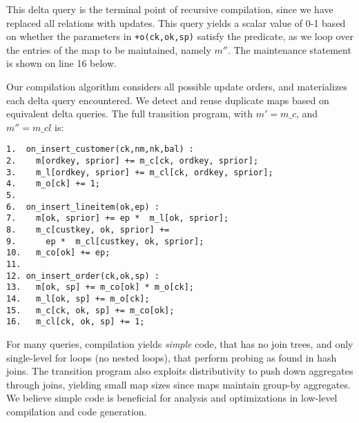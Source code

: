 {\noindent This delta query is the terminal point of recursive compilation, since
we have replaced all relations with updates. This query yields a scalar value of
0-1 based on whether the parameters in {\tt +o(ck,ok,sp)} satisfy the predicate,
as we loop over the entries of the map to be maintained, namely $m''$. The
maintenance statement is shown on line 16 below.


\noindent Our compilation algorithm considers all possible update orders, and
materializes each delta query encountered. We detect and reuse duplicate maps
based on equivalent delta queries. The full transition program, with $m' =
m\_c$, and $m''=m\_cl$ is:
}

{\footnotesize
\begin{verbatim}
1.  on_insert_customer(ck,nm,nk,bal) :
2.    m[ordkey, sprior] += m_c[ck, ordkey, sprior];
3.    m_l[ordkey, sprior] += m_cl[ck, ordkey, sprior];
4.    m_o[ck] += 1;
5. 
6.  on_insert_lineitem(ok,ep) :
7.    m[ok, sprior] += ep *  m_l[ok, sprior];
8.    m_c[custkey, ok, sprior] +=
9.      ep *  m_cl[custkey, ok, sprior];
10.   m_co[ok] += ep;
11.
12. on_insert_order(ck,ok,sp) :
13.   m[ok, sp] += m_co[ok] * m_o[ck]; 
14.   m_l[ok, sp] += m_o[ck];
15.   m_c[ck, ok, sp] += m_co[ok];
16.   m_cl[ck, ok, sp] += 1;
\end{verbatim}
}

For many queries, compilation yields \textit{simple} code, that has no join
trees, and only single-level for loops (no nested loops), that perform
probing as found in hash joins. The transition program also exploits
distributivity to push down aggregates through joins, yielding small map sizes
since maps maintain group-by aggregates. We believe simple code is
beneficial for analysis and optimizations in low-level compilation and
code generation.

